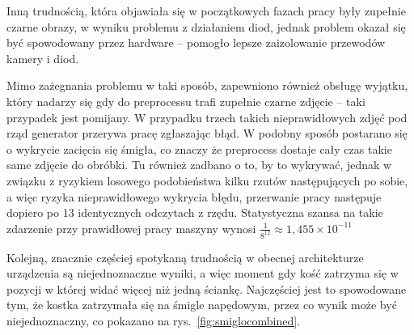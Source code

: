 Inną trudnością, która objawiała się w początkowych fazach pracy były zupełnie czarne obrazy,
w wyniku problemu z działaniem diod, jednak problem okazał się być spowodowany przez hardware --
pomogło lepsze zaizolowanie przewodów kamery i diod.

Mimo zażegnania problemu w taki sposób, zapewniono również obsługę wyjątku,
który nadarzy się gdy do preprocessu trafi zupełnie czarne zdjęcie -- taki przypadek jest pomijany.
W przypadku trzech takich nieprawidłowych zdjęć pod rząd generator przerywa pracę zgłaszając błąd.
W podobny sposób postarano się o wykrycie zacięcia się śmigła,
co znaczy że preprocess dostaje cały czas takie same zdjęcie do obróbki.
Tu również zadbano o to, by to wykrywać, jednak w związku z ryzykiem losowego podobieństwa kilku rzutów następujących po sobie,
a więc ryzyka nieprawidłowego wykrycia błędu, %
przerwanie pracy następuje dopiero po 13 identycznych odczytach z rzędu.
Statystyczna szansa na takie zdarzenie przy prawidłowej pracy maszyny wynosi
$\frac{1}{8^{12}} \approx 1{,}455 \times 10^{-11}$


Kolejną, znacznie częściej spotykaną trudnością w obecnej architekturze urządzenia są niejednoznaczne wyniki,
a więc moment gdy kość zatrzyma się w pozycji w której widać więcej niż jedną ściankę.
Najczęściej jest to spowodowane tym, że kostka zatrzymała się na śmigle napędowym,
przez co wynik może być niejednoznaczny, co pokazano na rys.~\ref{fig:smiglocombined}.

